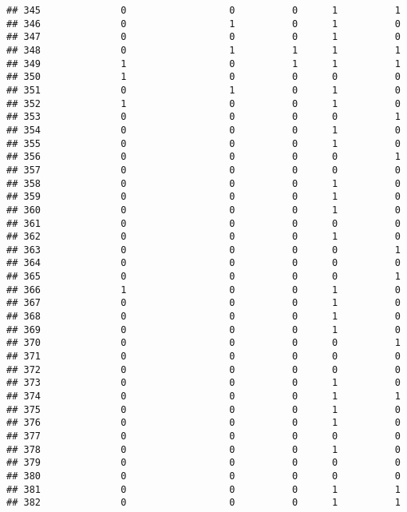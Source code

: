 \documentclass[
]{article}
\begin{document}
\begin{verbatim}
## 345              0                  0          0      1          1
## 346              0                  1          0      1          0
## 347              0                  0          0      1          0
## 348              0                  1          1      1          1
## 349              1                  0          1      1          1
## 350              1                  0          0      0          0
## 351              0                  1          0      1          0
## 352              1                  0          0      1          0
## 353              0                  0          0      0          1
## 354              0                  0          0      1          0
## 355              0                  0          0      1          0
## 356              0                  0          0      0          1
## 357              0                  0          0      0          0
## 358              0                  0          0      1          0
## 359              0                  0          0      1          0
## 360              0                  0          0      1          0
## 361              0                  0          0      0          0
## 362              0                  0          0      1          0
## 363              0                  0          0      0          1
## 364              0                  0          0      0          0
## 365              0                  0          0      0          1
## 366              1                  0          0      1          0
## 367              0                  0          0      1          0
## 368              0                  0          0      1          0
## 369              0                  0          0      1          0
## 370              0                  0          0      0          1
## 371              0                  0          0      0          0
## 372              0                  0          0      0          0
## 373              0                  0          0      1          0
## 374              0                  0          0      1          1
## 375              0                  0          0      1          0
## 376              0                  0          0      1          0
## 377              0                  0          0      0          0
## 378              0                  0          0      1          0
## 379              0                  0          0      0          0
## 380              0                  0          0      0          0
## 381              0                  0          0      1          1
## 382              0                  0          0      1          1

\end{verbatim}
\end{document}
